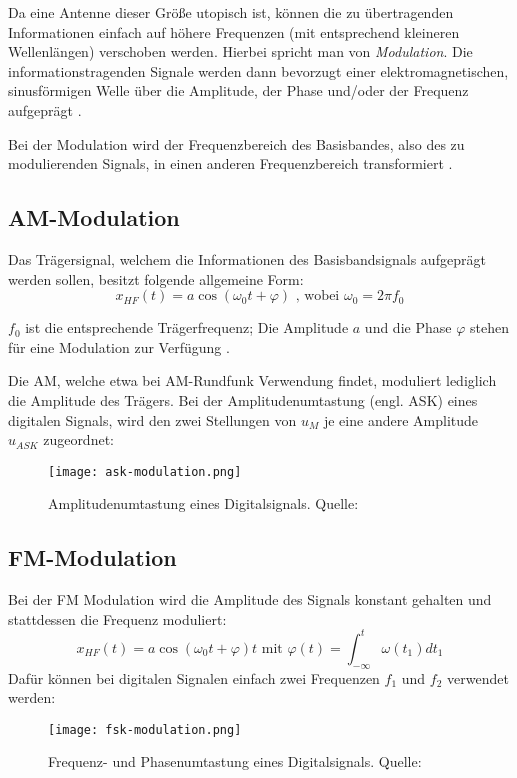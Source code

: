 Da eine Antenne dieser Größe utopisch ist, können die zu übertragenden Informationen einfach auf höhere Frequenzen (mit entsprechend kleineren Wellenlängen) verschoben werden. Hierbei spricht man von \textit{Modulation}.
Die informationstragenden Signale werden dann bevorzugt einer elektromagnetischen, sinusförmigen Welle über die Amplitude, der Phase und/oder der Frequenz aufgeprägt \cite[vgl. Werner, S. 242f]{Werner:2017}. 

Bei der Modulation wird der Frequenzbereich des Basisbandes, also des zu modulierenden Signals, in einen anderen Frequenzbereich transformiert \cite[vgl. Plaßmann, S. 1204]{Plassmann:2016}.

\subsection{AM-Modulation}
Das Trägersignal, welchem die Informationen des Basisbandsignals aufgeprägt werden sollen, besitzt folgende allgemeine Form:
\[ x_{HF} (t) = a \cos(\omega_0t + \varphi) \text{ , wobei }\omega_0 = 2\pi f_0 \]

\(f_0\) ist die entsprechende Trägerfrequenz; Die Amplitude \(a\) und die Phase \(\varphi\) stehen für eine Modulation zur Verfügung \cite[vgl. Heuberger, e. a., S. 39]{Heuberger:2017}.

Die \ac{AM}, welche etwa bei AM-Rundfunk Verwendung findet, moduliert lediglich die Amplitude des Trägers. Bei der Amplitudenumtastung (engl. \ac{ASK}) eines digitalen Signals, wird den zwei Stellungen von \(u_M\) je eine andere Amplitude \(u_{ASK}\) zugeordnet:

\begin{figure}[ht]
	\centering
	\texttt{[image: ask-modulation.png]}
	\caption[Amplitudenumtastung eines Digitalsignals]{Amplitudenumtastung eines Digitalsignals. Quelle: \cite[Plaßmann, S. 1218]{Plassmann:2016}} 
	\label{ask}
\end{figure}



\subsection{FM-Modulation}
Bei der FM Modulation wird die Amplitude des Signals konstant gehalten und stattdessen die Frequenz moduliert:
\[ x_{HF}(t) = a \cos (\omega_0 t + \varphi)t  \text{  mit } \varphi(t) = \int_{- \infty}^{t} \omega(t_1) dt_1\] 
Dafür können bei digitalen Signalen einfach zwei Frequenzen \(f_1\) und \(f_2\) verwendet werden:
\begin{figure}[ht]
	\centering
	\texttt{[image: fsk-modulation.png]}
	\caption[Frequenz- und Phasenumtastung eines Digitalsignals]{Frequenz- und Phasenumtastung eines Digitalsignals. Quelle: \cite[Plaßmann, S. 1218]{Plassmann:2016}} 
	\label{fsk}
\end{figure}



